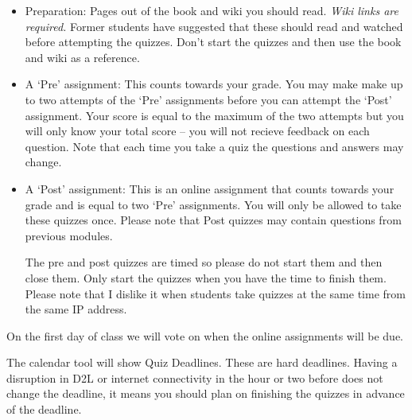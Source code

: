 \documentclass[letterpaper,10pt]{article}
\begin{document}
\begin{itemize}
\item Preparation: Pages out of the book and wiki you should read.
  \emph{Wiki links are required.}  Former students have suggested that these should read and watched before attempting the quizzes.  Don't start the quizzes and then use the book and wiki as a reference.
  
\item A `Pre' assignment: This counts towards your grade.
  You may make make up to two attempts of the `Pre' assignments before you can attempt the `Post' assignment.  
  Your score is equal
  to the maximum of the two attempts but you will only know your total score -- you will not recieve feedback on each question. Note that each time you take a quiz the questions and answers may change.

\item A `Post' assignment: This is an online assignment that counts
  towards your grade and is equal to two `Pre' assignments.  You will
  only be allowed to take these quizzes once.  Please note that Post quizzes may contain questions from previous modules.

  The pre and post quizzes are timed so please do not start them and
  then close them.  Only start the quizzes when you have the time to
  finish them.  Please note that I dislike it when students take
  quizzes at the same time from the same IP address.

\end{itemize}


On the first day of class we will vote on when the online assignments will be due.  




The calendar tool will show Quiz Deadlines. These are hard deadlines.  Having a disruption in D2L or internet connectivity in the hour or two before does not change the deadline, it means you should plan on finishing the quizzes in advance of the deadline.

  
\end{document}
